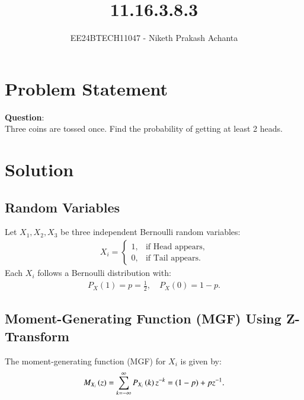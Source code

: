 \documentclass[journal]{IEEEtran}
\begin{document}

\vspace{3cm}

\title{11.16.3.8.3}
\author{EE24BTECH11047 - Niketh Prakash Achanta}
{\let\newpage\relax\maketitle}

\renewcommand{\thefigure}{\theenumi}
\renewcommand{\thetable}{\theenumi}
\setlength{\intextsep}{10pt} %

\renewcommand{\thetable}{\theenumi}

\section{Problem Statement}
\textbf{Question}:\\
Three coins are tossed once. Find the probability of getting at least 2 heads.

\section{Solution}

\subsection{Random Variables}
Let $ X_1, X_2, X_3 $ be three independent Bernoulli random variables:
\begin{align}
X_i =
\begin{cases}
1, & \text{if Head appears,} \\
0, & \text{if Tail appears.}
\end{cases}
\end{align}
Each $X_i$ follows a Bernoulli distribution with:
\begin{align}
P_{X}(1) = p = \frac{1}{2}, \quad P_{X}(0) = 1 - p.
\end{align}

\subsection{Moment-Generating Function (MGF) Using Z-Transform}
The moment-generating function (MGF) for $X_i$ is given by:
\begin{align}
M_{X_i}\left(z\right) = \sum_{k=-\infty}^{\infty} P_{X_i}\left(k\right) z^{-k} = (1 - p) + pz^{-1}.
\end{align}
\end{document}
